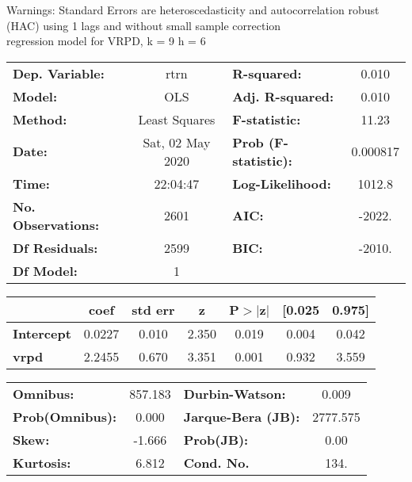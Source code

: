 Warnings: \newline
 [1] Standard Errors are heteroscedasticity and autocorrelation robust (HAC) using 1 lags and without small sample correction\\ 

regression model for VRPD, k = 9 h = 6\begin{center}
\begin{tabular}{lclc}
\toprule
\textbf{Dep. Variable:}    &       rtrn       & \textbf{  R-squared:         } &     0.010   \\
\textbf{Model:}            &       OLS        & \textbf{  Adj. R-squared:    } &     0.010   \\
\textbf{Method:}           &  Least Squares   & \textbf{  F-statistic:       } &     11.23   \\
\textbf{Date:}             & Sat, 02 May 2020 & \textbf{  Prob (F-statistic):} &  0.000817   \\
\textbf{Time:}             &     22:04:47     & \textbf{  Log-Likelihood:    } &    1012.8   \\
\textbf{No. Observations:} &        2601      & \textbf{  AIC:               } &    -2022.   \\
\textbf{Df Residuals:}     &        2599      & \textbf{  BIC:               } &    -2010.   \\
\textbf{Df Model:}         &           1      & \textbf{                     } &             \\
\bottomrule
\end{tabular}
\begin{tabular}{lcccccc}
                   & \textbf{coef} & \textbf{std err} & \textbf{z} & \textbf{P$> |$z$|$} & \textbf{[0.025} & \textbf{0.975]}  \\
\midrule
\textbf{Intercept} &       0.0227  &        0.010     &     2.350  &         0.019        &        0.004    &        0.042     \\
\textbf{vrpd}      &       2.2455  &        0.670     &     3.351  &         0.001        &        0.932    &        3.559     \\
\bottomrule
\end{tabular}
\begin{tabular}{lclc}
\textbf{Omnibus:}       & 857.183 & \textbf{  Durbin-Watson:     } &    0.009  \\
\textbf{Prob(Omnibus):} &   0.000 & \textbf{  Jarque-Bera (JB):  } & 2777.575  \\
\textbf{Skew:}          &  -1.666 & \textbf{  Prob(JB):          } &     0.00  \\
\textbf{Kurtosis:}      &   6.812 & \textbf{  Cond. No.          } &     134.  \\
\bottomrule
\end{tabular}
\end{center}

